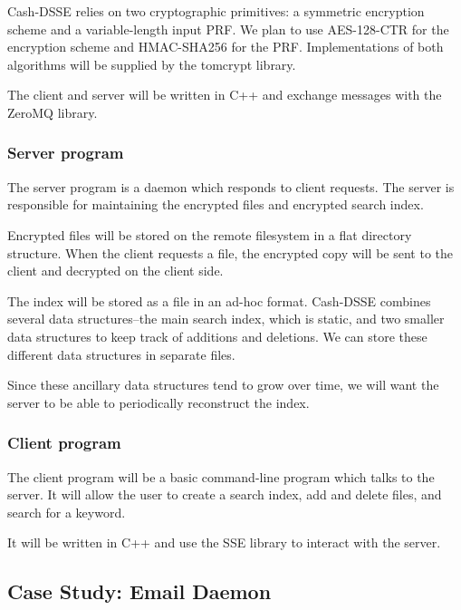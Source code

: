 \documentclass[onecolumn, draftclsnofoot,10pt, compsoc]{IEEEtran}
\begin{document}
Cash-DSSE relies on two cryptographic primitives:
a symmetric encryption scheme and a variable-length input PRF.
We plan to use AES-128-CTR for the encryption scheme and HMAC-SHA256 for the PRF.
Implementations of both algorithms will be supplied by the tomcrypt \cite{tomcrypt} library.

The client and server will be written in C++ and exchange messages with the ZeroMQ library.

\subsubsection{ Server program }

The server program is a daemon which responds to client requests.
The server is responsible for maintaining the encrypted files and encrypted search index.

Encrypted files will be stored on the remote filesystem in a flat directory structure.
When the client requests a file, the encrypted copy will be sent to the client and decrypted on the client side.

The index will be stored as a file in an ad-hoc format.
Cash-DSSE combines several data structures--the main search index, which is static, and two smaller data structures to keep track of additions and deletions.
We can store these different data structures in separate files. %

Since these ancillary data structures tend to grow over time, we will want the server to be able to periodically reconstruct the index. %

\subsubsection{ Client program }

The client program will be a basic command-line program which talks to the server.
It will allow the user to create a search index, add and delete files, and search for a keyword.

It will be written in C++ and use the SSE library to interact with the server.

\subsection{ Case Study: Email Daemon }
\label{subsec:email}
\end{document}
